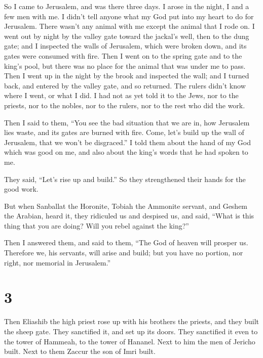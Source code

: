  So I came to Jerusalem, and was there three days.
 I arose in the night, I and a few men with me. I didn't
tell anyone what my God put into my heart to do for Jerusalem. There
wasn't any animal with me except the animal that I rode on.
 I went out by night by the valley gate toward the jackal's
well, then to the dung gate; and I inspected the walls of Jerusalem,
which were broken down, and its gates were consumed with fire.
 Then I went on to the spring gate and to the king's pool,
but there was no place for the animal that was under me to pass.
 Then I went up in the night by the brook and inspected the
wall; and I turned back, and entered by the valley gate, and so
returned.  The rulers didn't know where I went, or what I
did. I had not as yet told it to the Jews, nor to the priests, nor to
the nobles, nor to the rulers, nor to the rest who did the work.

 Then I said to them, ``You see the bad situation that we
are in, how Jerusalem lies waste, and its gates are burned with fire.
Come, let's build up the wall of Jerusalem, that we won't be
disgraced.''  I told them about the hand of my God which
was good on me, and also about the king's words that he had spoken to
me.

They said, ``Let's rise up and build.'' So they strengthened their hands
for the good work.

 But when Sanballat the Horonite, Tobiah the Ammonite
servant, and Geshem the Arabian, heard it, they ridiculed us and
despised us, and said, ``What is this thing that you are doing? Will you
rebel against the king?''

 Then I answered them, and said to them, ``The God of
heaven will prosper us. Therefore we, his servants, will arise and
build; but you have no portion, nor right, nor memorial in Jerusalem.''

\hypertarget{section-2}{%
\section{3}\label{section-2}}

 Then Eliashib the high priest rose up with his brothers the
priests, and they built the sheep gate. They sanctified it, and set up
its doors. They sanctified it even to the tower of Hammeah, to the tower
of Hananel.  Next to him the men of Jericho built. Next to
them Zaccur the son of Imri built.


